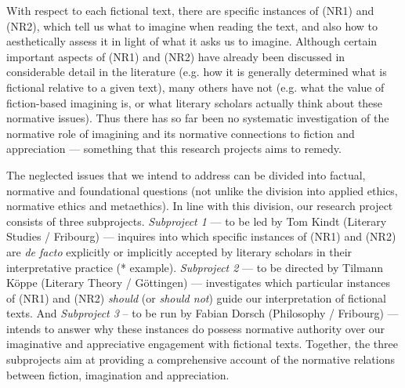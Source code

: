 \noindent With respect to each fictional text, there are specific instances of (NR1) and (NR2), which tell us what to imagine when reading the text, and also how to aesthetically assess it in light of what it asks us to imagine. Although certain important aspects of (NR1) and (NR2) have already been discussed in considerable detail in the literature (e.g. how it is generally determined what is fictional relative to a given text), many others have not (e.g. what the value of fiction-based imagining is, or what literary scholars actually think about these normative issues). Thus there has so far been no systematic investigation of the normative role of imagining and its normative connections to fiction and appreciation --- something that this research projects aims to remedy. 

The neglected issues that we intend to address can be divided into factual, normative and foundational questions (not unlike the division into applied ethics, normative ethics and metaethics). In line with this division, our research project consists of three subprojects. \emph{Subproject 1} --- to be led by Tom Kindt (Literary Studies / Fribourg) --- inquires into which specific instances of (NR1) and (NR2) are \emph{de facto} explicitly or implicitly accepted by literary scholars in their interpretative practice (* example). \emph{Subproject 2} --- to be directed by Tilmann K\"oppe (Literary Theory / G\"ottingen) --- investigates which particular instances of (NR1) and (NR2) \emph{should} (or \emph{should not}) guide our interpretation of fictional texts. And \emph{Subproject 3} -- to be run by Fabian Dorsch (Philosophy / Fribourg) --- intends to answer why these instances do possess normative authority over our imaginative and appreciative engagement with fictional texts. Together, the three subprojects aim at providing a comprehensive account of the normative relations between fiction, imagination and appreciation. 

\pagebreak